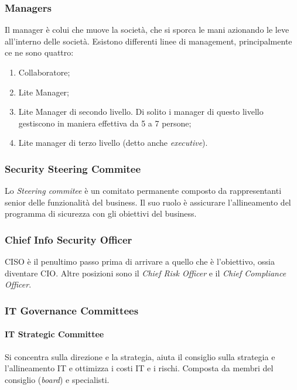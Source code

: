 \subsubsection{Managers}

Il manager è colui che muove la società, che si sporca le mani azionando le leve
all'interno delle società.
Esistono differenti linee di management, principalmente ce ne sono quattro:
\begin{enumerate}
\item Collaboratore;
\item Lite Manager;
\item Lite Manager di secondo livello. Di solito i manager di questo livello
gestiscono in maniera effettiva da 5 a 7 persone;
\item Lite manager di terzo livello (detto anche \textit{executive}).
\end{enumerate}

\subsubsection{Security Steering Commitee}

Lo \textit{Steering commitee} è un comitato permanente composto da
rappresentanti senior delle funzionalità del business. Il suo ruolo è
assicurare l'allineamento del programma di sicurezza con gli obiettivi del
business.

\subsubsection{Chief Info Security Officer}

CISO è il penultimo passo prima di arrivare a quello che è l'obiettivo, ossia
diventare CIO. Altre posizioni sono il \textit{Chief Risk Officer} e il
\textit{Chief Compliance Officer}.

\subsubsection{IT Governance Committees}

\paragraph{IT Strategic Committee}

Si concentra sulla direzione e la strategia, aiuta il consiglio sulla strategia
e l'allineamento IT e ottimizza i costi IT e i rischi. Composta da membri del
consiglio (\textit{board}) e specialisti.

